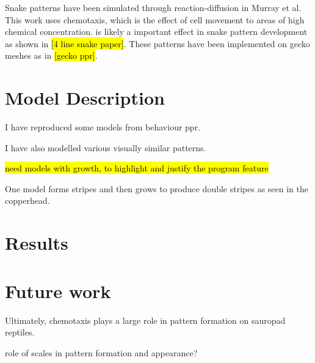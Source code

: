 Snake patterns have been simulated through reaction-diffusion in Murray et al. This work uses chemotaxis, which is the effect of cell movement to areas of high chemical concentration. is likely a important effect in snake pattern development as shown in \hl{[4 line snake paper]}. These patterns have been implemented on gecko meshes as in \hl{[gecko ppr]}. 

\section{Model Description}
I have reproduced some models from behaviour ppr. 

I have also modelled various visually similar patterns.

\hl{need models with growth, to highlight and justify the program feature}

One model forms stripes and then grows to produce double stripes as seen in the copperhead.

\section{Results}

\section{Future work}
Ultimately, chemotaxis plays a large role in pattern formation on sauropad reptiles.

role of scales in pattern formation and appearance? 
